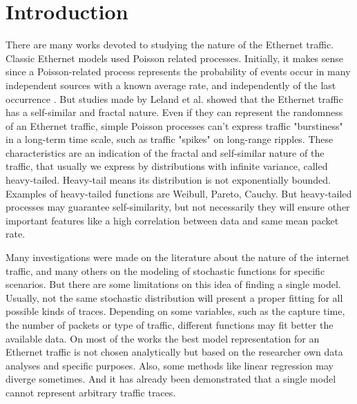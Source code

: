 \section{Introduction}\label{sec:introduction}

There are many works devoted to studying the nature of the Ethernet traffic\cite{selfsimilar-ethernet}. Classic Ethernet models used Poisson related processes. Initially, it makes sense since a Poisson-related process represents the probability of events occur in many independent sources with a known average rate, and independently of the last occurrence \cite{selfsimilar-ethernet} \cite{book-poisson}. But studies made by Leland et al.\cite{selfsimilar-ethernet} showed that the Ethernet traffic has a self-similar and fractal nature. Even if they can represent the randomness of an Ethernet traffic, simple Poisson processes can't express traffic "burstiness" in a long-term time scale, such as traffic "spikes" on long-range ripples. These characteristics are an indication of the fractal and self-similar nature of the traffic, that usually we express by distributions with infinite variance, called heavy-tailed. Heavy-tail means its distribution is not exponentially bounded\cite{sourcesonoff-paper}. Examples of heavy-tailed functions are Weibull, Pareto, Cauchy.  But heavy-tailed processes may guarantee self-similarity, but not necessarily they will ensure other important features like a high correlation between data and same mean packet rate.


Many investigations were made on the literature about the nature of the internet traffic\cite{selfsimilar-ethernet}\cite{analysis-self-similar}\cite{stochartic-selfsimilar}\cite{selfsimilar-highvariability}\cite{multi-player-online-game-self-similarity}, and many others on the modeling of stochastic functions for specific scenarios\cite{estimation-renewal-function-ethernet-traffic}\cite{modelling-of-self-similar}\cite{empirical-interarrival-study}\cite{modeling-concurrent-heavy-tailed}\cite{optimal-scheduling-of-heavy-tailed-traffic}\cite{modelling-of-self-similar}. But there are some limitations on this idea of finding a single model. Usually, not the same stochastic distribution will present a proper fitting for all possible kinds of traces\cite{sourcesonoff-paper}. Depending on some variables, such as the capture time, the number of packets or type of traffic, different functions may fit better the available data. On most of the works the best model representation for an Ethernet traffic is not chosen analytically but based on the researcher own data analyses and specific purposes\cite{hierarchical-dynamics-interarrival-times}\cite{modeling-concurrent-heavy-tailed}\cite{optimal-scheduling-of-heavy-tailed-traffic}. Also, some methods like linear regression may diverge sometimes. And it has already been demonstrated that a single model cannot represent arbitrary traffic traces\cite{sourcesonoff-paper}.  


